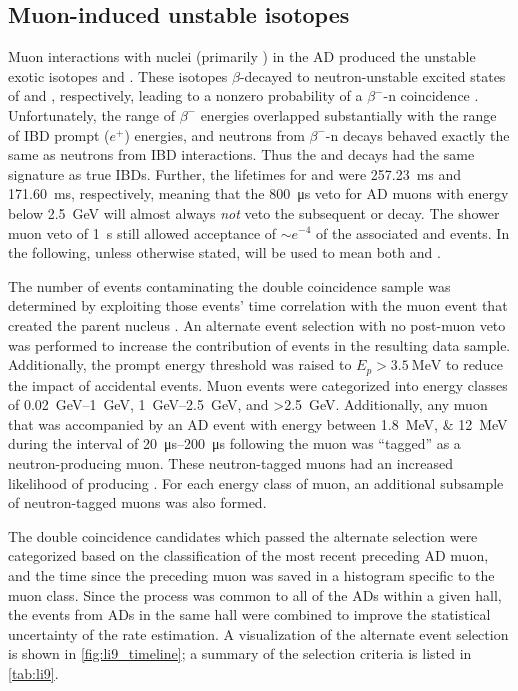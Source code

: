 \subsection{Muon-induced unstable isotopes}
\label{subsec:li9}

Muon interactions with nuclei (primarily ) in the AD
produced the unstable exotic isotopes \li{} and \he{}.
These isotopes $\beta$-decayed to neutron-unstable excited states
of  and , respectively,
leading to a nonzero probability of a $\beta^{-}$-n coincidence \cite{kamland_li9}.
Unfortunately, the range of $\beta^-$ energies overlapped substantially
with the range of IBD prompt ($e^+$) energies,
and neutrons from $\beta^-$-n decays behaved
exactly the same as neutrons from IBD interactions.
Thus the \li{} and \he{} decays had the same signature as true IBDs.
Further, the lifetimes for \li{} and \he{} were
\SI{257.23}{\ms} and \SI{171.60}{\ms}, respectively,
meaning that the \SI{800}{\us} veto for AD muons
with energy below \SI{2.5}{\GeV} will almost always
\emph{not} veto the subsequent \li{} or \he{} decay.
The shower muon veto of \SI{1}{\s} still allowed acceptance of
${\sim}e^{-4}$ of the associated \li{} and \he{} events.
In the following, unless otherwise stated,
\li{} will be used to mean both \li{} and \he{}.

The number of \li{} events contaminating the double coincidence sample
was determined by exploiting those events' time correlation
with the muon event that created the parent \li{} nucleus \cite{jinjing_2020may}.
An alternate event selection with no post-muon veto
was performed to increase the contribution of \li{} events
in the resulting data sample.
Additionally, the prompt energy threshold
was raised to $E_p > \SI{3.5}{\MeV}$
to reduce the impact of accidental events.
Muon events were categorized into energy classes
of \SIrange{0.02}{1}{\GeV}, \SIrange{1}{2.5}{\GeV},
and \SI{>2.5}{\GeV}.
Additionally, any muon that was accompanied by
an AD event with energy between \SIlist{1.8;12}{\MeV}
during the interval of \SIrange{20}{200}{\us} following the muon
was ``tagged'' as a neutron-producing muon.
These neutron-tagged muons had an increased likelihood
of producing \li{}.
For each energy class of muon,
an additional subsample of neutron-tagged muons was also formed.

The double coincidence candidates which passed the alternate selection
were categorized based on the classification
of the most recent preceding AD muon,
and the time since the preceding muon
was saved in a histogram specific to the muon class.
Since the \li{} process was common to all of the ADs within a given hall,
the events from ADs in the same hall were combined
to improve the statistical uncertainty of the rate estimation.
A visualization of the alternate event selection
is shown in \cref{fig:li9_timeline};
a summary of the selection criteria is listed in \cref{tab:li9}.

